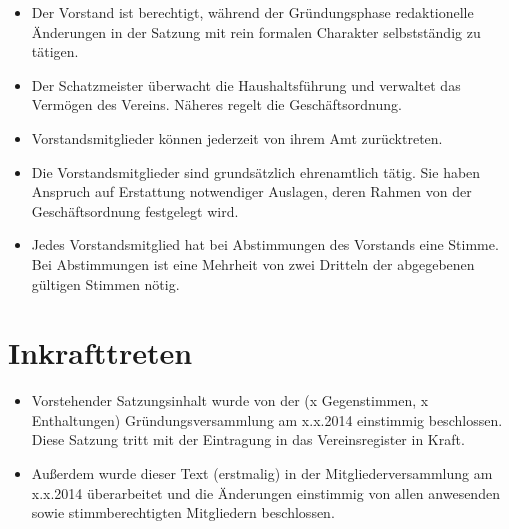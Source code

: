 \documentclass[a4paper,10pt]{article}
\begin{document}
\begin{itemize}
   \item Der Vorstand ist berechtigt, während der Gründungsphase redaktionelle Änderungen in der Satzung mit rein formalen Charakter selbstständig zu tätigen. 
   \item Der Schatzmeister überwacht die Haushaltsführung und verwaltet das Vermögen des Vereins. Näheres regelt die Geschäftsordnung.
   \item Vorstandsmitglieder können jederzeit von ihrem Amt zurücktreten.
   \item Die Vorstandsmitglieder sind grundsätzlich ehrenamtlich tätig. Sie haben Anspruch auf Erstattung notwendiger Auslagen, deren Rahmen von der Geschäftsordnung festgelegt wird.
   \item Jedes Vorstandsmitglied hat bei Abstimmungen des Vorstands eine Stimme. Bei Abstimmungen ist eine Mehrheit von zwei Dritteln der abgegebenen gültigen Stimmen nötig.
  \end{itemize}

\section{Inkrafttreten}
  \begin{itemize}
   \item Vorstehender Satzungsinhalt wurde von der (x Gegenstimmen, x Enthaltungen) Gründungsversammlung am x.x.2014 einstimmig beschlossen. Diese Satzung tritt mit der Eintragung in das Vereinsregister in Kraft. 
   \item Außerdem wurde dieser Text (erstmalig) in der Mitgliederversammlung am x.x.2014 überarbeitet und die Änderungen einstimmig von allen anwesenden sowie stimmberechtigten Mitgliedern beschlossen. 
  \end{itemize}

  
\end{document}
